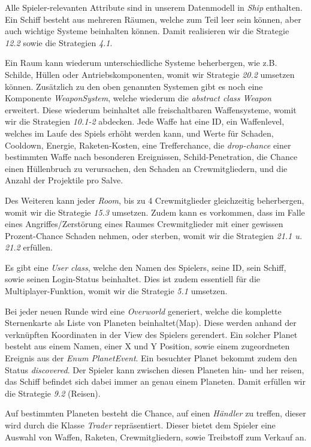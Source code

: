 \documentclass[fontsize=12pt,paper=a4,twoside]{scrartcl}
\begin{document}
Alle Spieler-relevanten Attribute sind in unserem Datenmodell in \textit{Ship} enthalten. Ein Schiff besteht aus mehreren Räumen, welche zum Teil leer sein können, aber auch wichtige Systeme beinhalten können. Damit realisieren wir die Strategie \textit{12.2} sowie die Strategien \textit{4.1}.

Ein Raum kann wiederum unterschiedliche Systeme beherbergen, wie z.B. Schilde, Hüllen oder Antriebskomponenten, womit wir Strategie \textit{20.2} umsetzen können. Zusätzlich zu den oben genannten Systemen gibt es noch eine Komponente \textit{WeaponSystem}, welche wiederum die \textit{abstract class Weapon} erweitert. Diese wiederum beinhaltet alle freischaltbaren Waffensysteme, womit wir die Strategien \textit{10.1-2} abdecken. Jede Waffe hat eine ID, ein Waffenlevel, welches im Laufe des Spiels erhöht werden kann, und Werte für Schaden, Cooldown, Energie, Raketen-Kosten, eine Trefferchance, die \textit{drop-chance} einer bestimmten Waffe nach besonderen Ereignissen, Schild-Penetration, die Chance einen Hüllenbruch zu verursachen, den Schaden an Crewmitgliedern, und die Anzahl der Projektile pro Salve.

Des Weiteren kann jeder \textit{Room}, bis zu 4 Crewmitglieder gleichzeitig beherbergen, womit wir die Strategie \textit{15.3} umsetzen. Zudem kann es vorkommen, dass im Falle eines Angriffes/Zerstörung eines Raumes Crewmitglieder mit einer gewissen Prozent-Chance Schaden nehmen, oder sterben, womit wir die Strategien \textit{21.1 u. 21.2} erfüllen.

Es gibt eine \textit{User class}, welche den Namen des Spielers, seine ID, sein Schiff, sowie seinen Login-Status beinhaltet. Dies ist zudem essentiell für die Multiplayer-Funktion, womit wir die Strategie \textit{5.1} umsetzen.

Bei jeder neuen Runde wird eine \textit{Overworld} generiert, welche die komplette Sternenkarte als Liste von Planeten beinhaltet(Map). Diese werden anhand der verknüpften Koordinaten in der View des Spielers gerendert. Ein solcher Planet besteht aus einem Namen, einer X und Y Position, sowie einem zugeordneten Ereignis aus der \textit{Enum PlanetEvent}. Ein besuchter Planet bekommt zudem den Status \textit{discovered}. Der Spieler kann zwischen diesen Planeten hin- und her reisen, das Schiff befindet sich dabei immer an genau einem Planeten. Damit erfüllen wir die Strategie \textit{9.2} (Reisen).

Auf bestimmten Planeten besteht die Chance, auf einen \textit{Händler} zu treffen, dieser wird durch die Klasse \textit{Trader} repräsentiert. Dieser bietet dem Spieler eine Auswahl von Waffen, Raketen, Crewmitgliedern, sowie Treibstoff zum Verkauf an.
\end{document}
